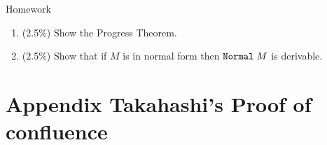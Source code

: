 
\begin{frame}{Homework}
  \begin{enumerate}
    \item (2.5\%) Show the Progress Theorem.
    \item (2.5\%) Show that if $M$ is in normal form then $\mathtt{Normal}\;M$ is derivable.
  \end{enumerate}
  
\end{frame}

%
%
% 
%

\appendix
\section{Appendix Takahashi's Proof of confluence}

